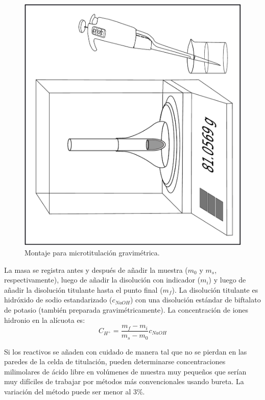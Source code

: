 \begin{figure}[H]
    \centering
    \includegraphics[height = 0.47\textwidth, angle=-90, origin=c]{App/images/Gtrit.pdf}
    \caption{Montaje para microtitulación gravimétrica.}
    \label{fig:celdatit}
\end{figure}

La masa se registra antes y después de añadir la muestra ($m_0$ y $m_s$, respectivamente), luego de añadir la disolución con indicador ($m_i$) y luego de añadir la disolución titulante hasta el punto final ($m_f$). La disolución titulante es hidróxido de sodio estandarizado ($c_{NaOH}$) con una disolución estándar de biftalato de potasio (también preparada gravimétricamente). La concentración de iones hidronio en la alícuota es:
\begin{equation}
    C_{H^+}=\frac{m_f-m_i}{m_s-m_0}c_{NaOH}
\end{equation}

Si los reactivos se añaden con cuidado de manera tal que no se pierdan en las paredes de la celda de titulación, pueden determinarse concentraciones milimolares de ácido libre en volúmenes de muestra muy pequeños que serían muy difíciles de trabajar por métodos más convencionales usando bureta. La variación del método puede ser menor al 3\%.

